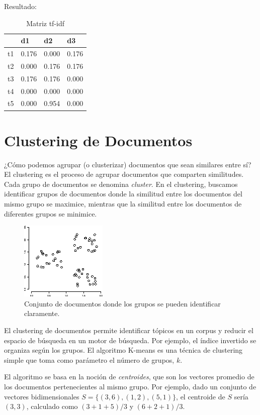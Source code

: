 Resultado:
 \begin{table}[h]
 \centering
\begin{tabular}{|l|r|r|r|}
\hline
 & \multicolumn{1}{l|}{d1} & \multicolumn{1}{l|}{d2} & \multicolumn{1}{l|}{d3} \\ \hline
t1 & 0.176 & 0.000 & 0.176 \\ \hline
t2 & 0.000 & 0.176 & 0.176 \\ \hline
t3 & 0.176 & 0.176 & 0.000 \\ \hline
t4 & 0.000 & 0.000 & 0.000 \\ \hline
t5 & 0.000 & 0.954 & 0.000 \\ \hline
\end{tabular}
\caption{Matriz tf-idf}
\end{table}
\section{Clustering de Documentos}

¿Cómo podemos agrupar (o clusterizar) documentos que sean similares entre sí? El clustering es el proceso de agrupar documentos que comparten similitudes. Cada grupo de documentos se denomina \emph{cluster}. En el clustering, buscamos identificar grupos de documentos donde la similitud entre los documentos del mismo grupo se maximice, mientras que la similitud entre los documentos de diferentes grupos se minimice.

\begin{figure}[h!]
\centering
\includegraphics[scale=0.6]{pics/cluster.png}
\caption{Conjunto de documentos donde los grupos se pueden identificar claramente.}
\end{figure}

El clustering de documentos permite identificar tópicos en un corpus y reducir el espacio de búsqueda en un motor de búsqueda. Por ejemplo, el índice invertido se organiza según los grupos. El algoritmo K-means es una técnica de clustering simple que toma como parámetro el número de grupos, $k$.

El algoritmo se basa en la noción de \emph{centroides}, que son los vectores promedio de los documentos pertenecientes al mismo grupo. Por ejemplo, dado un conjunto de vectores bidimensionales $S = \{(3,6), (1,2), (5,1)\}$, el centroide de $S$ sería $(3,3)$, calculado como $(3+1+5)/3$ y $(6+2+1)/3$.

